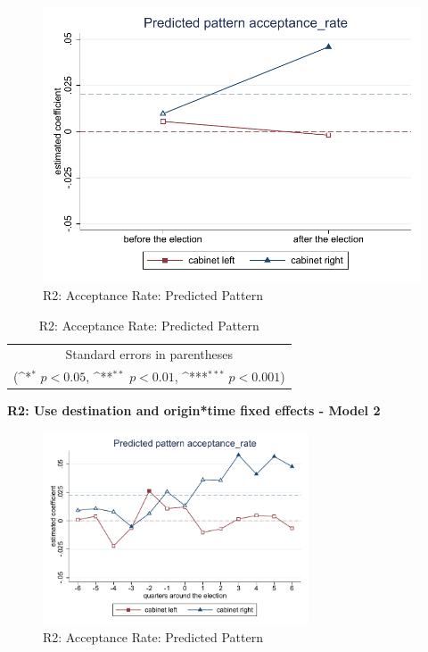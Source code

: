 \documentclass[10pt,a4paper]{scrartcl}
\begin{document}
\begin{figure}[!ht]
	\centering
	\includegraphics[width=1\textwidth]{figures_edited/acceptance_rate_graph1_R2.pdf}
	\caption{R2: Acceptance Rate: Predicted Pattern}
\end{figure}

\begin{table}[!ht]\centering
	\renewcommand{\arraystretch}{1.25}
	\def\sym#1{\ifmmode^{#1}\else\(^{#1}\)\fi}
	\caption{R2: Acceptance Rate: Predicted Pattern}
	\begin{tabular}{l*{2}{c}}
		\hline\hline
		
		\hline\hline
		\multicolumn{3}{c}{\footnotesize Standard errors in parentheses} \\
		\multicolumn{3}{c}{\footnotesize (\sym{*} \(p<0.05\), \sym{**} \(p<0.01\), \sym{***} \(p<0.001\))}\\
	\end{tabular}
\end{table}

\clearpage
\textbf{R2: Use destination and origin*time fixed effects - Model 2}
\begin{figure}[!ht]
	\centering
	\includegraphics[width=0.7\textwidth]{figures_edited/acceptance_rate_graph2_R2.pdf}
	\caption{R2: Acceptance Rate: Predicted Pattern}
\end{figure}
\end{document}
